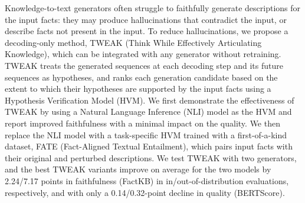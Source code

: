 Knowledge-to-text generators often struggle to faithfully generate descriptions for the input facts: they may produce hallucinations that contradict the input, or describe facts not present in the input. To reduce hallucinations, we propose a decoding-only method, TWEAK (Think While Effectively Articulating Knowledge), which can be integrated with any generator without retraining. TWEAK treats the generated sequences at each decoding step and its future sequences as hypotheses, and ranks each generation candidate based on the extent to which their hypotheses are supported by the input facts using a Hypothesis Verification Model (HVM). We first demonstrate the effectiveness of TWEAK by using a Natural Language Inference (NLI) model as the HVM and report improved faithfulness with a minimal impact on the quality. We then replace the NLI model with a task-specific HVM trained with a first-of-a-kind dataset, FATE (Fact-Aligned Textual Entailment), which pairs input facts with their original and perturbed descriptions. We test TWEAK with two generators, and the best TWEAK variants improve on average for the two models by 2.24/7.17 points in faithfulness (FactKB) in in/out-of-distribution evaluations, respectively, and with only a 0.14/0.32-point decline in quality (BERTScore).